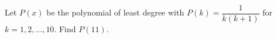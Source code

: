 Let $P(x)$ be the polynomial of least degree with $P(k)=\dfrac1{k(k+1)}$ for $k=1,2,\dots,10$. Find $P(11)$.
